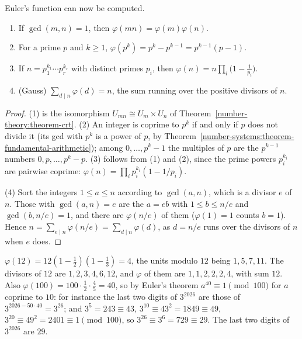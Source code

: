 Euler's function can now be computed.

\begin{proposition}\label{number-theory:proposition-euler-function}
\begin{enumerate}
\item If $\gcd(m, n) = 1$, then $\varphi(mn) = \varphi(m)\varphi(n)$.
\item For a prime $p$ and $k \geq 1$, $\varphi(p^k) = p^k - p^{k-1} = p^{k-1}(p - 1)$.
\item If $n = p_1^{k_1} \cdots p_r^{k_r}$ with distinct primes $p_i$, then $\varphi(n) = n\prod_i\bigl(1 - \frac{1}{p_i}\bigr)$.
\item (Gauss) $\sum_{d \mid n}\varphi(d) = n$, the sum running over the positive divisors of $n$.
\end{enumerate}
\end{proposition}

\begin{proof}
(1) is the isomorphism $U_{mn} \cong U_m \times U_n$ of Theorem~\ref{number-theory:theorem-crt}. (2) An integer is coprime to $p^k$ if and only if $p$ does not divide it (its gcd with $p^k$ is a power of
$p$, by Theorem~\ref{number-systems:theorem-fundamental-arithmetic}); among $0, \ldots, p^k - 1$ the multiples of $p$ are the $p^{k-1}$ numbers $0, p, \ldots, p^k - p$. (3) follows from (1) and (2), since
the prime powers $p_i^{k_i}$ are pairwise coprime: $\varphi(n) = \prod_ip_i^{k_i}(1 - 1/p_i)$.

(4) Sort the integers $1 \leq a \leq n$ according to $\gcd(a, n)$, which is a divisor $e$ of $n$. Those with $\gcd(a, n) = e$ are the $a = eb$ with $1 \leq b \leq n/e$ and $\gcd(b, n/e) = 1$, and there
are $\varphi(n/e)$ of them ($\varphi(1) = 1$ counts $b = 1$). Hence $n = \sum_{e \mid n}\varphi(n/e) = \sum_{d \mid n}\varphi(d)$, as $d = n/e$ runs over the divisors of $n$ when $e$ does.
\end{proof}

\begin{example}\label{number-theory:example-euler-function}
$\varphi(12) = 12(1 - \frac12)(1 - \frac13) = 4$, the units modulo $12$ being $1, 5, 7, 11$. The divisors of $12$ are $1, 2, 3, 4, 6, 12$, and $\varphi$ of them are $1, 1, 2, 2, 2, 4$, with sum $12$. Also
$\varphi(100) = 100 \cdot \frac12 \cdot \frac45 = 40$, so by Euler's theorem $a^{40} \equiv 1 \pmod{100}$ for $a$ coprime to $10$: for instance the last two digits of $3^{2026}$ are those of
$3^{2026 - 50 \cdot 40} = 3^{26}$; and $3^{5} = 243 \equiv 43$, $3^{10} \equiv 43^2 = 1849 \equiv 49$, $3^{20} \equiv 49^2 = 2401 \equiv 1 \pmod{100}$, so $3^{26} \equiv 3^6 = 729 \equiv 29$. The last two digits
of $3^{2026}$ are $29$.
\end{example}

